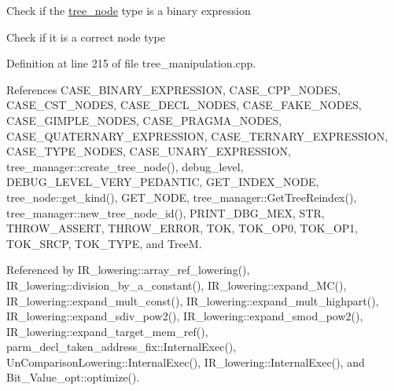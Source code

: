 Check if the \hyperlink{classtree__node}{tree\+\_\+node} type is a binary expression

Check if it is a correct node type 

Definition at line 215 of file tree\+\_\+manipulation.\+cpp.



References C\+A\+S\+E\+\_\+\+B\+I\+N\+A\+R\+Y\+\_\+\+E\+X\+P\+R\+E\+S\+S\+I\+ON, C\+A\+S\+E\+\_\+\+C\+P\+P\+\_\+\+N\+O\+D\+ES, C\+A\+S\+E\+\_\+\+C\+S\+T\+\_\+\+N\+O\+D\+ES, C\+A\+S\+E\+\_\+\+D\+E\+C\+L\+\_\+\+N\+O\+D\+ES, C\+A\+S\+E\+\_\+\+F\+A\+K\+E\+\_\+\+N\+O\+D\+ES, C\+A\+S\+E\+\_\+\+G\+I\+M\+P\+L\+E\+\_\+\+N\+O\+D\+ES, C\+A\+S\+E\+\_\+\+P\+R\+A\+G\+M\+A\+\_\+\+N\+O\+D\+ES, C\+A\+S\+E\+\_\+\+Q\+U\+A\+T\+E\+R\+N\+A\+R\+Y\+\_\+\+E\+X\+P\+R\+E\+S\+S\+I\+ON, C\+A\+S\+E\+\_\+\+T\+E\+R\+N\+A\+R\+Y\+\_\+\+E\+X\+P\+R\+E\+S\+S\+I\+ON, C\+A\+S\+E\+\_\+\+T\+Y\+P\+E\+\_\+\+N\+O\+D\+ES, C\+A\+S\+E\+\_\+\+U\+N\+A\+R\+Y\+\_\+\+E\+X\+P\+R\+E\+S\+S\+I\+ON, tree\+\_\+manager\+::create\+\_\+tree\+\_\+node(), debug\+\_\+level, D\+E\+B\+U\+G\+\_\+\+L\+E\+V\+E\+L\+\_\+\+V\+E\+R\+Y\+\_\+\+P\+E\+D\+A\+N\+T\+IC, G\+E\+T\+\_\+\+I\+N\+D\+E\+X\+\_\+\+N\+O\+DE, tree\+\_\+node\+::get\+\_\+kind(), G\+E\+T\+\_\+\+N\+O\+DE, tree\+\_\+manager\+::\+Get\+Tree\+Reindex(), tree\+\_\+manager\+::new\+\_\+tree\+\_\+node\+\_\+id(), P\+R\+I\+N\+T\+\_\+\+D\+B\+G\+\_\+\+M\+EX, S\+TR, T\+H\+R\+O\+W\+\_\+\+A\+S\+S\+E\+RT, T\+H\+R\+O\+W\+\_\+\+E\+R\+R\+OR, T\+OK, T\+O\+K\+\_\+\+O\+P0, T\+O\+K\+\_\+\+O\+P1, T\+O\+K\+\_\+\+S\+R\+CP, T\+O\+K\+\_\+\+T\+Y\+PE, and TreeM.



Referenced by I\+R\+\_\+lowering\+::array\+\_\+ref\+\_\+lowering(), I\+R\+\_\+lowering\+::division\+\_\+by\+\_\+a\+\_\+constant(), I\+R\+\_\+lowering\+::expand\+\_\+\+M\+C(), I\+R\+\_\+lowering\+::expand\+\_\+mult\+\_\+const(), I\+R\+\_\+lowering\+::expand\+\_\+mult\+\_\+highpart(), I\+R\+\_\+lowering\+::expand\+\_\+sdiv\+\_\+pow2(), I\+R\+\_\+lowering\+::expand\+\_\+smod\+\_\+pow2(), I\+R\+\_\+lowering\+::expand\+\_\+target\+\_\+mem\+\_\+ref(), parm\+\_\+decl\+\_\+taken\+\_\+address\+\_\+fix\+::\+Internal\+Exec(), Un\+Comparison\+Lowering\+::\+Internal\+Exec(), I\+R\+\_\+lowering\+::\+Internal\+Exec(), and Bit\+\_\+\+Value\+\_\+opt\+::optimize().

